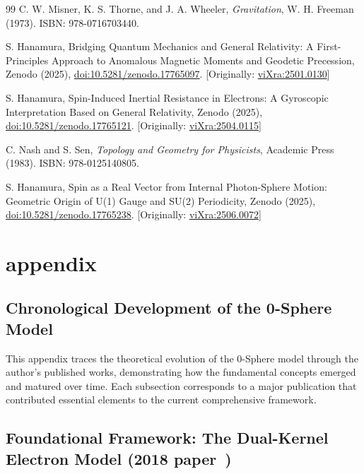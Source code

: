 \documentclass[%
 reprint,
 amsmath,amssymb,
 aps,
]{revtex4-1}
\numberwithin{equation}{section}%
\begin{document}
\begin{thebibliography}{99}
C. W. Misner, K. S. Thorne, and J. A. Wheeler, \textit{Gravitation}, W. H. Freeman (1973). ISBN: 978-0716703440.

S. Hanamura, Bridging Quantum Mechanics and General Relativity: A First-Principles Approach to Anomalous Magnetic Moments and Geodetic Precession, Zenodo (2025), \href{https://doi.org/10.5281/zenodo.17765097}{doi:10.5281/zenodo.17765097}. [Originally: \href{https://vixra.org/abs/2501.0130}{viXra:2501.0130}]

S. Hanamura, Spin-Induced Inertial Resistance in Electrons: A Gyroscopic Interpretation Based on General Relativity, Zenodo (2025), \href{https://doi.org/10.5281/zenodo.17765121}{doi:10.5281/zenodo.17765121}. [Originally: \href{https://vixra.org/abs/2504.0115}{viXra:2504.0115}]

C. Nash and S. Sen, \textit{Topology and Geometry for Physicists}, Academic Press (1983). ISBN: 978-0125140805.

S. Hanamura, Spin as a Real Vector from Internal Photon-Sphere Motion: Geometric Origin of U(1) Gauge and SU(2) Periodicity, Zenodo (2025), \href{https://doi.org/10.5281/zenodo.17765238}{doi:10.5281/zenodo.17765238}. [Originally: \href{https://vixra.org/abs/2506.0072}{viXra:2506.0072}]

\end{thebibliography}

\section{appendix}

\subsection{Chronological Development of the 0-Sphere Model}

This appendix traces the theoretical evolution of the 0-Sphere model through the author's published works, demonstrating how the fundamental concepts emerged and matured over time. Each subsection corresponds to a major publication that contributed essential elements to the current comprehensive framework.

\subsection{Foundational Framework: The Dual-Kernel Electron Model (2018 paper~\cite{hanamura1811.0312})}
\end{document}
